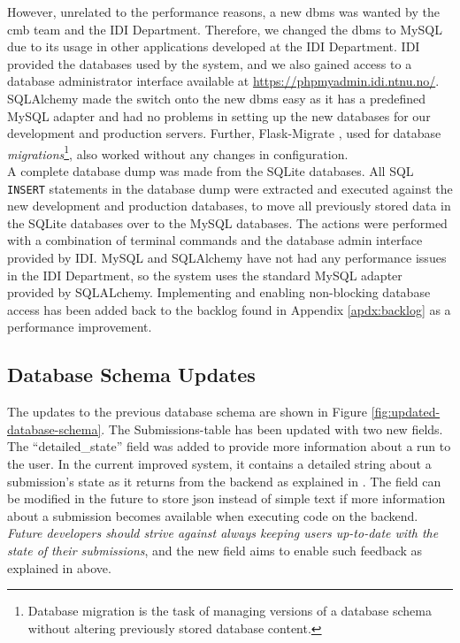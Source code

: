 However, unrelated to the performance reasons, a new \gls{dbms} was wanted by the \gls{cmb} team and the IDI Department. Therefore, we changed the \gls{dbms} to MySQL due to its usage in other applications developed at the IDI Department. IDI provided the databases used by the system, and we also gained access to a database administrator interface available at \url{https://phpmyadmin.idi.ntnu.no/}. SQLAlchemy made the switch onto the new \gls{dbms} easy as it has a predefined MySQL adapter and had no problems in setting up the new databases for our development and production servers. Further, Flask-Migrate \cite{FLASKMIGRATE}, used for database \textit{migrations}\footnote{Database migration is the task of managing versions of a database schema without altering previously stored database content.}, also worked without any changes in configuration. \\

A complete database dump was made from the SQLite databases. All SQL \texttt{INSERT} statements in the database dump were extracted and executed against the new development and production databases, to move all previously stored data in the SQLite databases over to the MySQL databases. The actions were performed with a combination of terminal commands and the database admin interface provided by IDI. MySQL and SQLAlchemy have not had any performance issues in the IDI Department, so the system uses the standard MySQL adapter provided by SQLALchemy. Implementing and enabling non-blocking database access has been added back to the backlog found in Appendix \ref{apdx:backlog} as a performance improvement.

\subsection{Database Schema Updates}
\label{subsec:impr-database}
The updates to the previous database schema are shown in Figure \ref{fig:updated-database-schema}. The Submissions-table has been updated with two new fields. The ``detailed\_state'' field was added to provide more information about a run to the user. In the current improved system, it contains a detailed string about a submission's state as it returns from the backend as explained in . The field can be modified in the future to store \gls{json} instead of simple text if more information about a submission becomes available when executing code on the backend. \textit{Future developers should strive against always keeping users up-to-date with the state of their submissions}, and the new field aims to enable such feedback as explained in  above. \\

